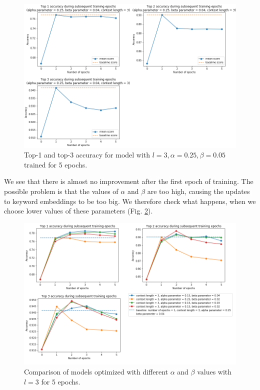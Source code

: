 \documentclass{llncs}
\begin{document}
\begin{figure}
    \centering
    \caption{Top-1 and top-3 accuracy for model with \(l=3, \alpha=0.25, \beta=0.05\) trained for 5 epochs.}
    \label{fig:exp4_1_epochs_fixed}
    \includegraphics[scale=0.65]{res/exp4_epoch_top_acc.png}
\end{figure}

We see that there is almost no improvement after the first epoch of training.
The possible problem is that the values of \(\alpha\) and \(\beta\) are too high, causing the updates to keyword embeddings to be too big.
We therefore check what happens, when we choose lower values of these parameters (Fig. \ref{fig:exp4_2_epochs_comparison}).

\begin{figure}
    \centering
    \caption{Comparison of models optimized with different \(\alpha\) and \(\beta\) values with \(l=3\) for 5 epochs.}
    \label{fig:exp4_2_epochs_comparison}
    \includegraphics[scale=0.65]{res/exp4_epoch_multiconfiguration_top_acc.png}
\end{figure}
\end{document}
